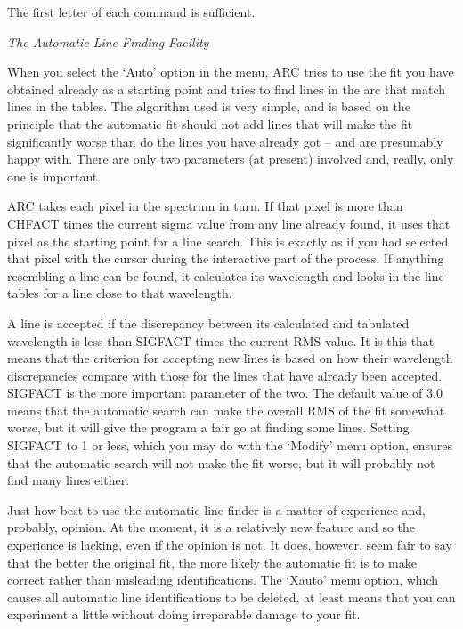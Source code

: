 The first letter of each command is sufficient.


\goodbreak
\vspace{12pt}
{\it The Automatic Line-Finding Facility}

When you select the `Auto' option in the menu, ARC tries to use the
fit you have obtained already as a starting point and
tries to find lines in the arc that match lines in the tables.
The algorithm used is very simple, and is based on the principle that the
automatic fit should not add lines that will make the fit significantly 
worse than do the lines you have already got -- and are presumably happy
with.  There are only two parameters (at present) involved and, really,
only one is important.

ARC takes each pixel in the spectrum in turn.  If that pixel is 
more than CHFACT times the current sigma value from any line already found, 
it uses  that pixel as the starting point for a line search.  This is exactly
as if you had selected that pixel with the cursor during the interactive
part of the process.  If anything resembling a line can be found, it 
calculates its wavelength and looks in the line tables for a line 
close to that wavelength.

A line is accepted if the discrepancy between its calculated and
tabulated wavelength is less than SIGFACT times the current RMS
value.  It is this that means that the criterion for accepting new lines
is based on how their wavelength discrepancies compare with those for
the lines that have already been accepted.  SIGFACT is the more important 
parameter of the two.  The default value of 3.0 means that the automatic
search can make the overall RMS of the fit somewhat worse, but it will
give the program a fair go at finding some lines.  Setting SIGFACT to 1 or
less, which you may do with the `Modify' menu option, ensures that the
automatic search will not make the fit worse, but it will probably not find
many lines either.

Just how best to use the automatic line finder is a matter of
experience and, probably, opinion.  At the moment, it is a relatively new
feature and so the experience is lacking, even if the opinion is not.
It does, however, seem fair to say that the better the original fit, the
more likely the automatic fit is to make correct rather than misleading
identifications.  The `Xauto' menu option, which causes all automatic line
identifications to be deleted, at least means that you can experiment a little
without doing irreparable damage to your fit.  

